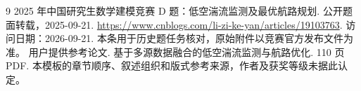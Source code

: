 \clearpage
\begin{thebibliography}{9}
 2025 年中国研究生数学建模竞赛 D 题：低空湍流监测及最优航路规划.
公开题面转载，2025-09-21. \url{https://www.cnblogs.com/li-zi-ke-yan/articles/19103763}.
访问日期：2026-09-21. 本条用于历史题任务核对，原始附件以竞赛官方发布文件为准。
 用户提供参考论文. 基于多源数据融合的低空湍流监测与航路优化.
110 页 PDF. 本模板的章节顺序、叙述组织和版式参考来源，作者及获奖等级未据此认定。
\end{thebibliography}
